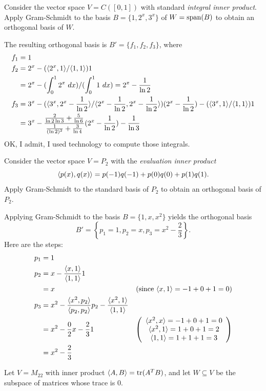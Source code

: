 \ii Consider the vector space $V=C([0,1])$ with standard {\em integral inner product}. 
\\
Apply Gram-Schmidt to the basis $B=\{1,2^x, 3^x\}$ of $W=\operatorname{span}(B)$ to obtain an orthogonal basis of $W$. 
\\
\begin{solution}
\noindent The resulting orthogonal basis is $B'=\{f_1, f_2,f_3\}$, where 
\begin{align*}
f_1&=1 \\
f_2&=2^x-(\langle 2^x,1\rangle/\langle 1,1\rangle)1\\
     &=2^x-(\int_{0}^12^x \ dx)/(\int_0^1 1 \ dx)=2^x-\frac{1}{\ln 2}\\
f_3&=3^x-(\langle 3^x,2^x-\frac{1}{\ln 2}\rangle/\langle 2^x-\frac{1}{\ln 2}, 2^x-\frac{1}{\ln 2}\rangle)(2^x-\frac{1}{\ln 2})-(\langle 3^x,1\rangle/\langle 1,1\rangle)1\\
&=3^x-\frac{\frac{2}{\ln 2\ln 3}+\frac{5}{\ln 6}}{\frac{1}{(\ln 2)^2}+\frac{3}{\ln 4}}(2^x-\frac{1}{\ln 2})-\frac{1}{\ln 3}
\end{align*}
OK, I admit, I used technology to compute those integrals. 
\end{solution}
\ii Consider the vector space $V=P_2$ with the {\em evaluation inner product} 
\[
\langle p(x),q(x)\rangle=p(-1)q(-1)+p(0)q(0)+p(1)q(1).
\] 
Apply Gram-Schmidt to the standard basis of $P_2$ to obtain an orthogonal basis of $P_2$. 
\\
\begin{solution}
\noindent Applying Gram-Schmidt to the basis $B=\{1,x,x^2\}$ yields the orthogonal basis 
\[
B'=\left\{p_1=1, p_2=x, p_3=x^2-\frac{2}{3}\right\}.
\]
Here are the steps: 
\begin{align*}
p_1&=1 \\
p_2&=x-\frac{\langle x,1\rangle}{\langle 1,1\rangle}1\\
&=x &\text{(since $\langle x,1\rangle=-1+0+1=0$)}\\
p_3&=x^2-\frac{\langle x^2,p_2\rangle}{\langle p_2,p_2\rangle}p_2-\frac{\langle x^2,1\rangle}{\langle 1,1\rangle}\\
&=x^2-\frac{0}{2}x-\frac{2}{3}1&\left(\begin{array}{c} \langle x^2,x\rangle=-1+0+1=0\\ \langle x^2,1\rangle=1+0+1=2\\ \langle 1,1\rangle=1+1+1=3\end{array}\right)\\
&=x^2-\frac{2}{3}
\end{align*}
\end{solution}
\ii Let $V=M_{22}$ with inner product $\langle A,B\rangle=\operatorname{tr}(A^TB)$, and let $W\subseteq V$ be the subspace of matrices whose trace is 0. 
